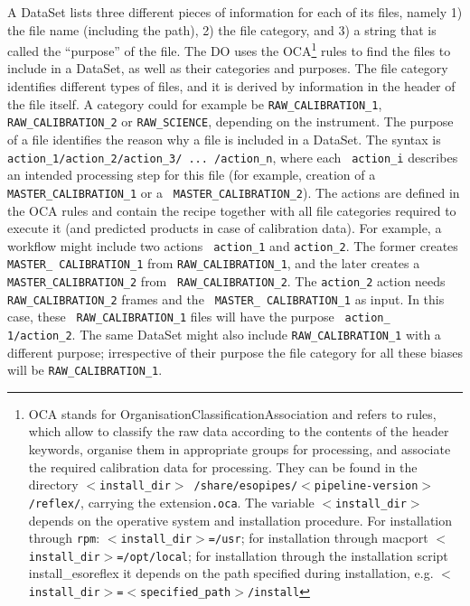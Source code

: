 A DataSet lists three different pieces of information for each of its
files, namely 1) the file name (including the path), 2) the file
category, and 3) a string that is called the ``purpose'' of the file.
The DO uses the OCA\footnote{OCA stands for
  OrganisationClassificationAssociation and refers to rules, which
  allow to classify the raw data according to the contents of the
  header keywords, organise them in appropriate groups for processing,
  and associate the required calibration data for processing. They can
  be found in the directory $<${\tt install\_dir}$>${\tt
    /share/esopipes/}$<${\tt pipeline-version}$>${\tt /reflex/},
  carrying the extension{\tt .oca}.
The variable  $<${\tt install\_dir}$>$ depends on the operative system 
and installation procedure. For installation through {\tt rpm}:
  $<${\tt install\_dir}$>${\tt =/usr}; for installation through macport
  $<${\tt install\_dir}$>${\tt =/opt/local}; for installation through 
the installation script install\_esoreflex it depends on the path 
specified during installation, e.g.
$<${\tt install\_dir}$>${\tt =}$<${\tt specified\_path}$>${\tt /install}} 
rules to find the files to include
in a DataSet, as well as their categories and purposes.  The file
category identifies different types of files, and it
  is derived by information in the header of the file itself. A
  category could for example be {\tt RAW\_CALIBRATION\_1}, {\tt
    RAW\_CALIBRATION\_2} or {\tt RAW\_SCIENCE}, depending on the
  instrument.   The purpose of a file identifies the reason why a
file is included in a DataSet. The syntax is {\tt
  action\_1/action\_2/action\_3/ ... /action\_n}, where each {\tt
  action\_i} describes an intended processing step for this file (for
example, creation of a {\tt MASTER\_CALIBRATION\_1} or a {\tt
  MASTER\_CALIBRATION\_2}). 
The actions are defined in the OCA rules
and contain the recipe together with all file categories required to
execute it (and predicted products in case of calibration data).  For
example, a workflow might include two actions {\tt
  action\_1} and {\tt action\_2}. The former
creates {\tt MASTER\_ CALIBRATION\_1} from {\tt RAW\_CALIBRATION\_1},
and the later creates a {\tt MASTER\_CALIBRATION\_2} from {\tt
  RAW\_CALIBRATION\_2}. The {\tt action\_2} action needs
{\tt RAW\_CALIBRATION\_2} frames and the {\tt
  MASTER\_ CALIBRATION\_1} as input. In this case, these {\tt
  RAW\_CALIBRATION\_1} files will have the purpose {\tt
  action\_ 1/action\_2}. The same
  DataSet might also include {\tt RAW\_CALIBRATION\_1} with a different
  purpose; irrespective of their purpose the file category for all
  these biases will be {\tt RAW\_CALIBRATION\_1}.


